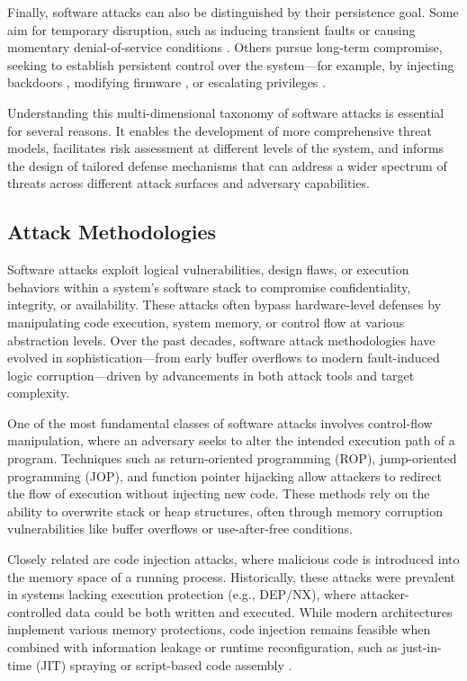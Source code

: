 Finally, software attacks can also be distinguished by their persistence goal. Some aim for temporary disruption, such as inducing transient faults or causing momentary denial-of-service conditions \cite{7081075}. Others pursue long-term compromise, seeking to establish persistent control over the system—for example, by injecting backdoors \cite{tol2022toward}, modifying firmware \cite{bettayeb2019firmware}, or escalating privileges \cite{davi2010privilege}.

Understanding this multi-dimensional taxonomy of software attacks is essential for several reasons. It enables the development of more comprehensive threat models, facilitates risk assessment at different levels of the system, and informs the design of tailored defense mechanisms that can address a wider spectrum of threats across different attack surfaces and adversary capabilities.

\subsection{Attack Methodologies}
Software attacks exploit logical vulnerabilities, design flaws, or execution behaviors within a system’s software stack to compromise confidentiality, integrity, or availability. These attacks often bypass hardware-level defenses by manipulating code execution, system memory, or control flow at various abstraction levels. Over the past decades, software attack methodologies have evolved in sophistication—from early buffer overflows to modern fault-induced logic corruption—driven by advancements in both attack tools and target complexity.

One of the most fundamental classes of software attacks involves control-flow manipulation, where an adversary seeks to alter the intended execution path of a program. Techniques such as return-oriented programming (ROP)\cite{checkoway2010return}, jump-oriented programming (JOP)\cite{bletsch2011jump}, and function pointer hijacking \cite{bertani2023untangle} allow attackers to redirect the flow of execution without injecting new code. These methods rely on the ability to overwrite stack or heap structures, often through memory corruption vulnerabilities like buffer overflows or use-after-free conditions.

Closely related are code injection attacks, where malicious code is introduced into the memory space of a running process. Historically, these attacks were prevalent in systems lacking execution protection (e.g., DEP\cite{isawa2013generic}/NX\cite{werner2016no}), where attacker-controlled data could be both written and executed. While modern architectures implement various memory protections, code injection remains feasible when combined with information leakage or runtime reconfiguration, such as just-in-time (JIT) spraying \cite{chen2013jitsafe} or script-based code assembly \cite{wang2013metasymploit}.

